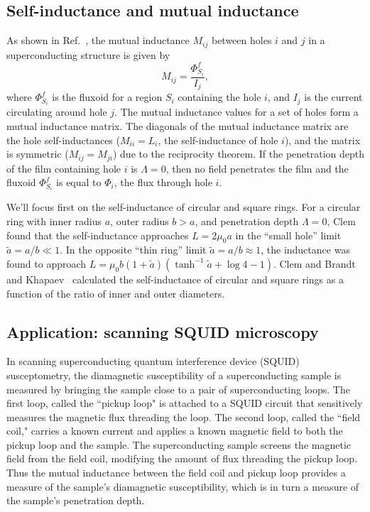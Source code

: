 \documentclass[final,3p,times]{elsarticle}
\begin{document}
\subsection{Self-inductance and mutual inductance}
\label{section:examples:mutual-inductance}

As shown in Ref.~\cite{Brandt2005-wj}, the mutual inductance $M_{ij}$ between holes $i$ and $j$ in a superconducting structure is given by
\begin{equation}
    M_{ij}=\frac{\Phi^f_{S_i}}{I_j},
\end{equation}
where $\Phi^f_{S_i}$ is the fluxoid for a region $S_i$ containing the hole $i$, and $I_j$ is the current circulating around hole $j$. The mutual inductance values for a set of holes form a mutual inductance matrix. The diagonals of the mutual inductance matrix are the hole self-inductances ($M_{ii}=L_i$, the self-inductance of hole $i$), and the matrix is symmetric ($M_{ij}=M_{ji}$) due to the reciprocity theorem. If the penetration depth of the film containing hole $i$ is $\Lambda = 0$, then no field penetrates the film and the fluxoid $\Phi^f_{S_i}$ is equal to $\Phi_i$, the flux through hole $i$.

We'll focus first on the self-inductance of circular and square rings. For a circular ring with inner radius $a$, outer radius $b>a$, and penetration depth $\Lambda=0$, Clem~\cite{Babaei_Brojeny2003-la} found that the self-inductance approaches $L=2\mu_0 a$ in the ``small hole'' limit $\tilde{a}=a/b\ll 1$. In the opposite ``thin ring'' limit $\tilde{a}=a/b\approx 1$, the inductance was found to approach $L=\mu_0b(1+\tilde{a})(\tanh^{-1}\tilde{a}+\log 4 - 1)$. Clem and Brandt~\cite{Brandt2004-ew} and Khapaev~\cite{Khapaev1997-kw} calculated the self-inductance of circular and square rings as a function of the ratio of inner and outer diameters.

\subsection{Application: scanning SQUID microscopy}
\label{section:examples:scanning-squid}

In scanning superconducting quantum interference device (SQUID) susceptometry, the diamagnetic susceptibility of a superconducting sample is measured by bringing the sample close to a pair of superconducting loops. The first loop, called the ``pickup loop" is attached to a SQUID circuit that sensitively measures the magnetic flux threading the loop. The second loop, called the ``field coil," carries a known current and applies a known magnetic field to both the pickup loop and the sample. The superconducting sample screens the magnetic field from the field coil, modifying the amount of flux threading the pickup loop. Thus the mutual inductance between the field coil and pickup loop provides a measure of the sample's diamagnetic susceptibility, which is in turn a measure of the sample's penetration depth.
\end{document}
